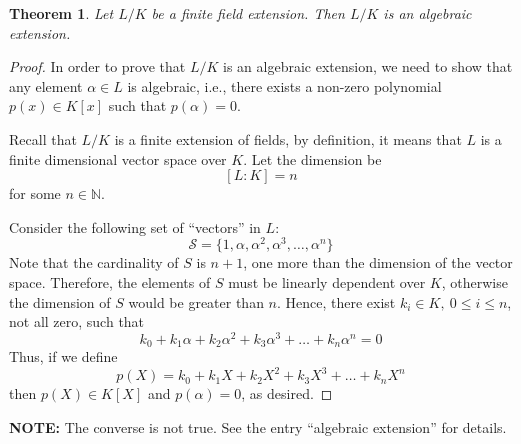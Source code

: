 \documentclass[12pt]{article}
\newtheorem{thm}{Theorem}
\newcommand{\Nats}{\mathbb{N}}
\begin{document}
\begin{thm}
Let $L/K$ be a finite field extension. Then $L/K$ is an algebraic
extension.
\end{thm}

\begin{proof}
In order to prove that $L/K$ is an algebraic extension, we need to show that any element
$\alpha\in L$ is algebraic, i.e., there exists a non-zero
polynomial $p(x)\in K[x]$ such that $p(\alpha)=0$.

Recall that $L/K$ is a finite extension of fields, by definition,
it means that $L$ is a finite dimensional vector space over $K$.
Let the dimension be
$$[L\colon K]=n$$
for some $n\in \Nats$.

Consider the following set of ``vectors'' in $L$:
$$\mathcal{S}=\{ 1, \alpha, \alpha^2,\alpha^3,\ldots,\alpha^n\}$$
Note that the cardinality of $S$ is $n+1$, one more than the
dimension of the vector space. Therefore, the elements of $S$ must
be linearly dependent over $K$, otherwise the dimension of $S$
would be greater than $n$. Hence, there exist $k_i\in K,\ 0\leq i
\leq n$, not all zero, such that
$$k_0+k_1\alpha+k_2\alpha^2+k_3\alpha^3+\ldots+k_n\alpha^n=0$$
Thus, if we define
$$p(X)=k_0+k_1X+k_2X^2+k_3X^3+\ldots+k_nX^n$$
then $p(X)\in K[X]$ and $p(\alpha)=0$, as desired.

\end{proof}

{\bf NOTE: } The converse is not true. See the entry ``algebraic
extension'' for details.
\end{document}
